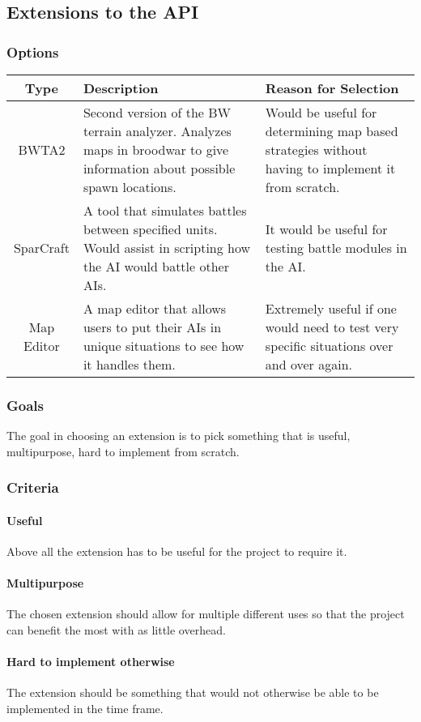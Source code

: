 \documentclass[10pt,letterpaper,onecolumn,draftclsnofoot]{IEEEtran}
\begin{document}
\subsection{Extensions to the API}
\subsubsection{Options}
\begin{center}
	\begin{tabular}{ ||C|L|L|| } 
		\hline
		Type & Description & Reason for Selection \\
		\hline
		BWTA2 & Second version of the BW terrain analyzer. Analyzes maps in broodwar to give information about possible spawn locations. & Would be useful for determining map based strategies without having to implement it from scratch. \\ 
		\hline
		SparCraft & A tool that simulates battles between specified units. Would assist in scripting how the AI would battle other AIs. & It would be useful for testing battle modules in the AI. \\ 
		\hline
		Map Editor & A map editor that allows users to put their AIs in unique situations to see how it handles them. & Extremely useful if one would need to test very specific situations over and over again. \\ 
		\hline
	\end{tabular}
\end{center}
\subsubsection{Goals}
The goal in choosing an extension is to pick something that is useful, multipurpose, hard to implement from scratch.
\subsubsection{Criteria}
\paragraph{Useful}
Above all the extension has to be useful for the project to require it.
\paragraph{Multipurpose}
The chosen extension should allow for multiple different uses so that the project can benefit the most with as little overhead.
\paragraph{Hard to implement otherwise}
The extension should be something that would not otherwise be able to be implemented in the time frame. 
\end{document}
